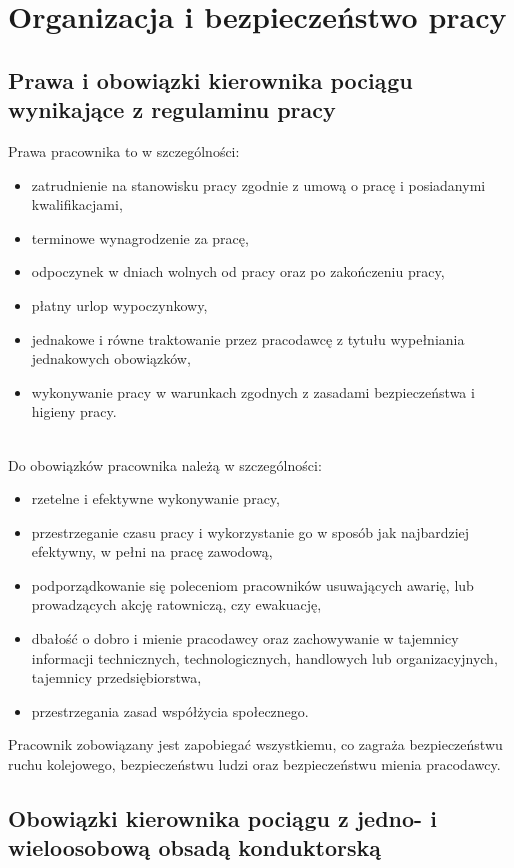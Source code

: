 \part{Organizacja i bezpieczeństwo pracy}
\chapter{Prawa i obowiązki kierownika pociągu wynikające z regulaminu pracy}
Prawa pracownika to w szczególności:
\begin{itemize}
	\item zatrudnienie na stanowisku pracy zgodnie z umową o pracę i posiadanymi kwalifikacjami,
	\item terminowe wynagrodzenie za pracę, 
	\item odpoczynek w dniach wolnych od pracy oraz po zakończeniu pracy, 
	\item płatny urlop wypoczynkowy, 
	\item jednakowe i równe traktowanie przez pracodawcę z tytułu wypełniania jednakowych obowiązków, 
	\item wykonywanie pracy w warunkach zgodnych z zasadami bezpieczeństwa i higieny pracy.
\end{itemize}
\\Do obowiązków pracownika należą w szczególności:

\begin{itemize}
	\item rzetelne i efektywne wykonywanie pracy,
	\item przestrzeganie czasu pracy i wykorzystanie go w sposób jak najbardziej efektywny, w pełni na pracę zawodową,
	\item podporządkowanie się poleceniom pracowników usuwających awarię, lub prowadzących akcję ratowniczą, czy ewakuację,
	\item dbałość o dobro i mienie pracodawcy oraz zachowywanie w tajemnicy informacji technicznych, technologicznych, handlowych lub organizacyjnych, tajemnicy przedsiębiorstwa,
	\item przestrzegania zasad współżycia społecznego.
\end{itemize}
     Pracownik zobowiązany jest zapobiegać wszystkiemu, co zagraża bezpieczeństwu ruchu kolejowego, bezpieczeństwu ludzi oraz bezpieczeństwu mienia pracodawcy. 

\chapter{Obowiązki kierownika pociągu z jedno- i wieloosobową obsadą konduktorską}

